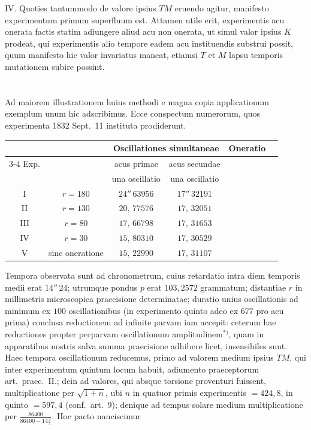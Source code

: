 \documentclass[fontsize=11pt,paper=a4,twoside,openany]{scrbook}
\begin{document}
IV. Quoties tantummodo de valore ipsius $TM$ eruendo agitur, manifesto experimentum primum superfluum est. Attamen utile erit, experimentis acu onerata factis statim adiungere aliud acu non onerata, ut simul valor ipsius $K$ prodeat, qui experimentis alio tempore eadem acu instituendis substrui possit, quum manifesto hic valor invariatus maneat, etiamsi $T$ et $M$ lapsu temporis mutationem subire possint.

\section{}

Ad maiorem illustrationem huius methodi e magna copia applicationum exemplum unum hic adscribimus. Ecce conspectum numerorum, quos experimenta 1832 Sept.~11 instituta prodiderunt.

\begin{center}
\small
\begin{tabular}{|c|c|c|c|c|c|}
\hline
& & \multicolumn{2}{c|}{Oscillationes simultaneae} & Oneratio \\
\cline{3-4}
Exp. & & acus primae & acus secundae & \\
& & una oscillatio & una oscillatio & \\
\hline
I & $r=180$ & $24''\,63956$ & $17''\,32191$ & \\
II & $r=130$ & $20,\,77576$ & $17,\,32051$ & \\
III & $r=80$ & $17,\,66798$ & $17,\,31653$ & \\
IV & $r=30$ & $15,\,80310$ & $17,\,30529$ & \\
V & sine oneratione & $15,\,22990$ & $17,\,31107$ & \\
\hline
\end{tabular}
\end{center}

Tempora observata sunt ad chronometrum, cuius retardatio intra diem temporis medii erat $14''\,24$; utrumque pondus $p$ erat $103{,}2572$ grammatum; distantiae $r$ in millimetris microscopica praecisione determinatae; duratio unius oscillationis ad minimum ex $100$ oscillationibus (in experimento quinto adeo ex $677$ pro acu prima) conclusa reductionem ad infinite parvam iam accepit: ceterum hae reductiones propter perparvam oscillationum amplitudinem$^{*)}$, quam in apparatibus nostris salva summa praecisione adhibere licet, insensibiles sunt. Haec tempora oscillationum reducemus, primo ad valorem medium ipsius $TM$, qui inter experimentum quintum locum habuit, adiumento praeceptorum art.~praec.~II.; dein ad valores, qui absque torsione proventuri fuissent, multiplicatione per $\sqrt{1+n}$, ubi $n$ in quatuor primis experimentis $=424{,}8$, in quinto $=597{,}4$ (conf.~art.~9); denique ad tempus solare medium multiplicatione per $\frac{86400}{86400-14\frac{2}{5}}$. Hoc pacto nanciscimur
\end{document}
